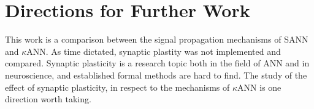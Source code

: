 % 
% 








\section{Directions for Further Work}
This work is a comparison between the signal propagation mechanisms of SANN and $\kappa$ANN.
As time dictated, synaptic plastity was not implemented and compared.
Synaptic plasticity is a research topic both in the field of ANN and in neuroscience, and established formal methods are hard to find.
The study of the effect of synaptic plasticity, in respect to the mechanisms of $\kappa$ANN is one direction worth taking. %

